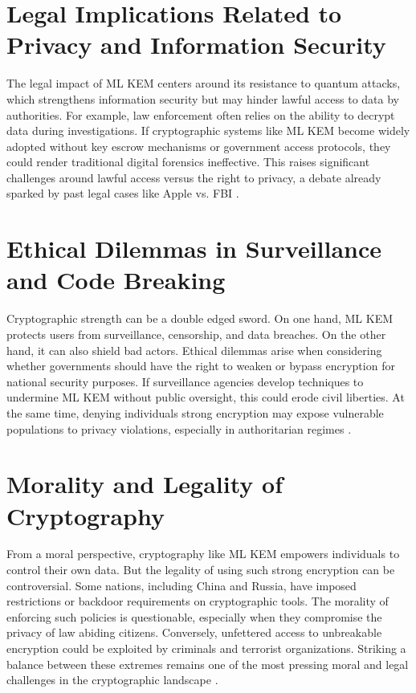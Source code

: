 \documentclass[12pt]{article}
\begin{document}
\section*{Legal Implications Related to Privacy and Information Security}
The legal impact of ML KEM centers around its resistance to quantum attacks, which strengthens information security but may hinder lawful access to data by authorities. For example, law enforcement often relies on the ability to decrypt data during investigations. If cryptographic systems like ML KEM become widely adopted without key escrow mechanisms or government access protocols, they could render traditional digital forensics ineffective. This raises significant challenges around lawful access versus the right to privacy, a debate already sparked by past legal cases like Apple vs. FBI \cite{trappe}.

\section*{Ethical Dilemmas in Surveillance and Code Breaking}
Cryptographic strength can be a double edged sword. On one hand, ML KEM protects users from surveillance, censorship, and data breaches. On the other hand, it can also shield bad actors. Ethical dilemmas arise when considering whether governments should have the right to weaken or bypass encryption for national security purposes. If surveillance agencies develop techniques to undermine ML KEM without public oversight, this could erode civil liberties. At the same time, denying individuals strong encryption may expose vulnerable populations to privacy violations, especially in authoritarian regimes \cite{trappe}.

\section*{Morality and Legality of Cryptography}
From a moral perspective, cryptography like ML KEM empowers individuals to control their own data. But the legality of using such strong encryption can be controversial. Some nations, including China and Russia, have imposed restrictions or backdoor requirements on cryptographic tools. The morality of enforcing such policies is questionable, especially when they compromise the privacy of law abiding citizens. Conversely, unfettered access to unbreakable encryption could be exploited by criminals and terrorist organizations. Striking a balance between these extremes remains one of the most pressing moral and legal challenges in the cryptographic landscape \cite{trappe}.
\end{document}
